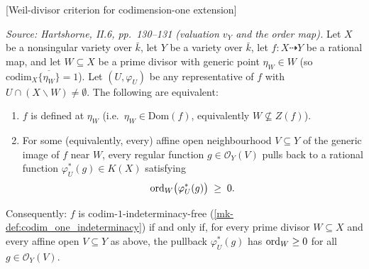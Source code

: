 \begin{theorem}

  [Weil-divisor criterion for codimension-one extension]
  \label{mk-thm:weil_divisor_obstruction}

  \textit{Source: Hartshorne, II.6, pp.~130--131 (valuation \(v_Y\) and the order map).}
  Let \(X\) be a nonsingular variety over \(\bar k\), let \(Y\) be a variety over \(\bar k\),
  let \(f \colon X \dashrightarrow Y\) be a rational map, and let \(W \subseteq X\) be a
  prime divisor with generic point \(\eta_W \in W\) (so
  \(\mathrm{codim}_X \overline{\{\eta_W\}} = 1\)). Let \((U, \varphi_U)\) be any representative of
  \(f\) with \(U \cap (X \smallsetminus W) \neq \emptyset\). The following are equivalent:
  \begin{enumerate}
    \item \(f\) is defined at \(\eta_W\) (i.e.\ \(\eta_W \in \mathrm{Dom}(f)\), equivalently
      \(W \not\subseteq Z(f)\)).
    \item For some (equivalently, every) affine open neighbourhood \(V \subseteq Y\) of
      the generic image of \(f\) near \(W\), every regular function \(g \in
      \mathcal O_Y(V)\) pulls back to a rational function \(\varphi_U^\ast(g) \in K(X)\)
      satisfying
      \[
        \operatorname{ord}_W\bigl(\varphi_U^\ast(g)\bigr) \;\geq\; 0.
      \]
  \end{enumerate}

  Consequently: \(f\) is codim-\(1\)-indeterminacy-free
  (\ref{mk-def:codim_one_indeterminacy}) if and only if, for every prime divisor
  \(W \subseteq X\) and every affine open \(V \subseteq Y\) as above, the pullback
  \(\varphi_U^\ast(g)\) has \(\operatorname{ord}_W \geq 0\) for all \(g \in \mathcal O_Y(V)\).
\end{theorem}

